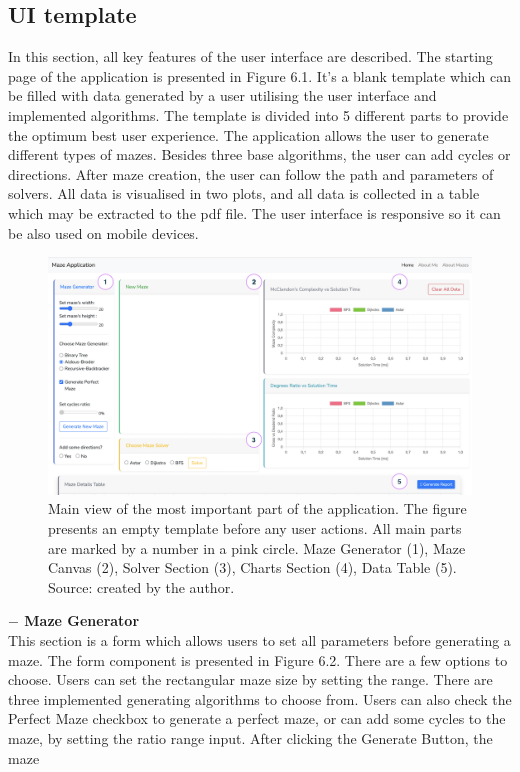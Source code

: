 \subsection{UI template}
In this section, all key features of the user interface are described. The starting page of the application is presented in Figure 6.1. It's a blank template which can be
filled with data generated by a user utilising the user interface and implemented algorithms. The template is divided into 5 different parts to provide the optimum
best user experience. The application allows the user to generate different types of mazes. Besides three base algorithms, the user can add cycles or directions.
After maze creation, the user can follow the path and parameters of solvers. All data is visualised in two plots, and all data is collected in a table which may be extracted to
the pdf file. The user interface is responsive so it can be also used on mobile devices.
\begin{figure}[!h]
    \centering
    \includegraphics[width=0.9\linewidth]{templateView}
    \caption{Main view of the most important part of the application. The figure presents an empty template before any user actions. All main parts are 
    marked by a number in a pink circle. Maze Generator (1), Maze Canvas (2), Solver Section (3), Charts Section (4), Data Table (5).\\ Source: created by the author.}
    \end{figure}
\newpage
\textbf{$-$ Maze Generator}\\
This section is a form which allows users to set all parameters before generating a maze. The form component is presented in Figure 6.2. There are a few options to
choose. Users can set the rectangular maze size by setting the range. There are three implemented generating algorithms to choose from. Users can also check the
Perfect Maze checkbox to generate a perfect maze, or can add some cycles to the maze, by setting the ratio range input. After clicking the Generate Button, the maze
